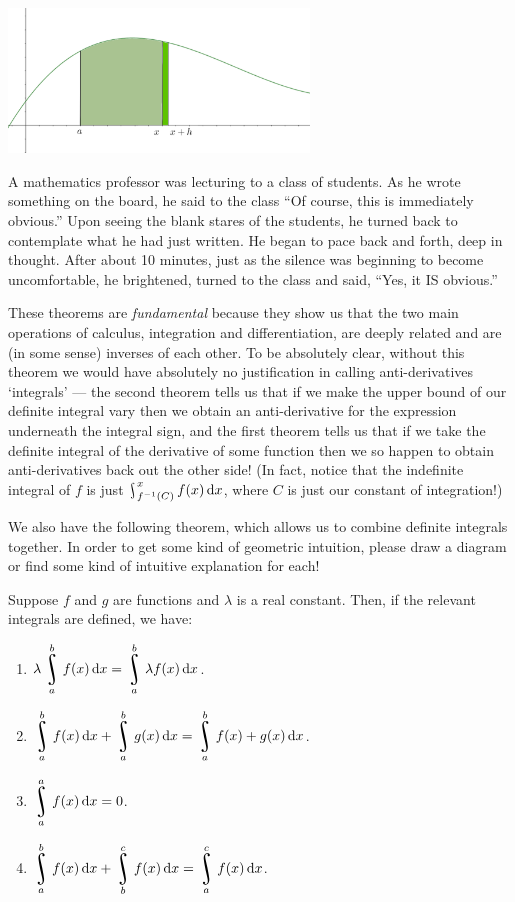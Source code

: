 \begin{center}
  \includegraphics[width=0.6\textwidth]{ftc1}
\end{center}

\begin{joke}
  A mathematics professor was lecturing to a class of students. As he wrote something on the board,
  he said to the class ``Of course, this is immediately obvious.'' Upon seeing the blank stares of
  the students, he turned back to contemplate what he had just written. He began to pace back and
  forth, deep in thought. After about 10 minutes, just as the silence was beginning to become uncomfortable,
  he brightened, turned to the class and said, ``Yes, it IS obvious.''
\end{joke}

These theorems are \emph{fundamental} because they show us that the two main operations of calculus, integration and differentiation,
are deeply related and are (in some sense) inverses of each other. To be absolutely clear, without this theorem we would have absolutely
no justification in calling anti-derivatives `integrals' --- the second theorem tells us that if we make the upper bound of our definite integral
vary then we obtain an anti-derivative for the expression underneath the integral sign, and the first theorem tells us that if we take the definite
integral of the derivative of some function then we so happen to obtain anti-derivatives back out the other side! (In fact, notice that the indefinite
integral of $ f $ is just $ \rint^x_{f^{-1}(C)} f(x) \dif{x} $, where $ C $ is just our constant of integration!)

We also have the following theorem, which allows us to combine definite integrals together. In order to get some kind of geometric intuition,
please draw a diagram or find some kind of intuitive explanation for each!
\begin{thm}
  Suppose $ f $ and $ g $ are functions and $ \lambda $ is a real constant. Then, if the relevant integrals are defined, we have:
  \begin{enumerate}
    \item $ \displaystyle\lambda \rint_a^b f(x) \dif{x} = \rint_a^b \lambda f(x) \dif{x} $.
    \item $ \displaystyle\rint_a^b f(x) \dif{x} + \rint_a^b g(x) \dif{x} = \rint_a^b f(x) + g(x) \dif{x} $.
    \item $ \displaystyle\rint_a^a f(x) \dif{x} = 0 $.
    \item $ \displaystyle\rint_a^b f(x) \dif{x} + \rint_b^c f(x) \dif{x} = \rint_a^c f(x) \dif{x} $.
  \end{enumerate}
\end{thm}

